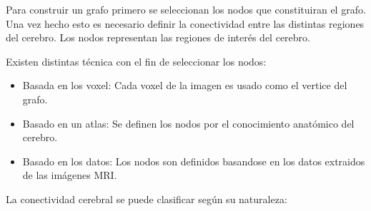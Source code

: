 Para construir un grafo primero se seleccionan los nodos que constituiran el grafo. Una vez hecho esto es necesario definir la conectividad entre las distintas regiones del cerebro. Los nodos representan las regiones de interés del cerebro.

Existen distintas técnica con el fin de seleccionar los nodos:

\begin{itemize}
	\item Basada en los voxel: Cada voxel de la imagen es usado como el vertice del grafo.
	\item Basado en un atlas: Se definen los nodos por el conocimiento anatómico del cerebro.
	\item Basado en los datos: Los nodos son definidos basandose en los datos extraidos de las imágenes MRI.
\end{itemize}

La conectividad cerebral se puede clasificar según su naturaleza:


